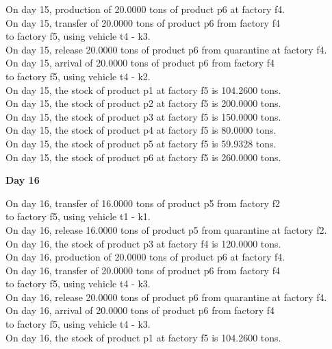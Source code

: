 \begin{table}[H]
\begin{multicols}{2}
\begin{tabbing}
On day 15, production of 20.0000 tons of product p6 at factory f4. \\
On day 15, transfer of 20.0000 tons of product p6 from factory f4 \\ to factory f5, using vehicle t4 - k3. \\
On day 15, release 20.0000 tons of product p6 from quarantine at factory f4. \\
On day 15, arrival of 20.0000 tons of product p6 from factory f4 \\ to factory f5, using vehicle t4 - k2. \\
On day 15, the stock of product p1 at factory f5 is 104.2600 tons. \\
On day 15, the stock of product p2 at factory f5 is 200.0000 tons. \\
On day 15, the stock of product p3 at factory f5 is 150.0000 tons. \\
On day 15, the stock of product p4 at factory f5 is 80.0000 tons. \\
On day 15, the stock of product p5 at factory f5 is 59.9328 tons. \\
On day 15, the stock of product p6 at factory f5 is 260.0000 tons. \\
\end{tabbing} \vspace{-2.0em}
\textbf{Day 16}
\vspace{-1.6em}
\begin{tabbing}
On day 16, transfer of 16.0000 tons of product p5 from factory f2 \\ to factory f5, using vehicle t1 - k1. \\
On day 16, release 16.0000 tons of product p5 from quarantine at factory f2. \\
On day 16, the stock of product p3 at factory f4 is 120.0000 tons. \\
On day 16, production of 20.0000 tons of product p6 at factory f4. \\
On day 16, transfer of 20.0000 tons of product p6 from factory f4 \\ to factory f5, using vehicle t4 - k3. \\
On day 16, release 20.0000 tons of product p6 from quarantine at factory f4. \\
On day 16, arrival of 20.0000 tons of product p6 from factory f4 \\ to factory f5, using vehicle t4 - k3. \\
On day 16, the stock of product p1 at factory f5 is 104.2600 tons. \\

\end{tabbing}
\end{multicols}
\end{table}
